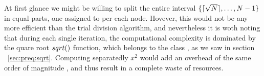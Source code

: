 At first glance we might be willing to split the entire interval
$\{ \lceil\sqrt{N}\rceil, \ldots, N-1 \}$ in equal parts, one assigned to per each
node. Hovever, this would not be any more efficient than the trial division
algorithm, and nevertheless it is woth noting that during each single iteration,
the computational complexity is dominated by the quare root $\dsqrt$ function,
which belongs to the class , as we saw in section
~\ref{sec:preq:sqrt}. Computing separatedly $x^2$ would add an overhead of the
same order of magnitude , and thus result in a complete waste of
resources.
